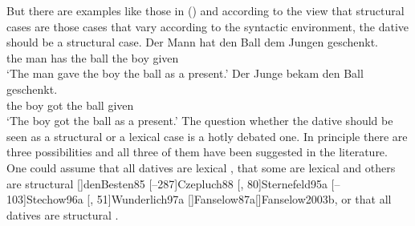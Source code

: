 But there are examples like those in () and according to the view that structural cases are
those cases that vary according to the syntactic environment, the dative should be a structural case.
\eal
\ex 
\gll Der Mann  hat   den Ball dem Jungen geschenkt.\\
     the man   has   the ball the boy given\\
\glt `The man gave the boy the ball as a present.'
\ex 
\gll Der Junge bekam den Ball geschenkt.\\
     the boy   got   the ball given\\   
\glt `The boy got the ball as a present.'
\zl
The question whether the dative should be seen as a structural or a lexical case is a hotly debated
one. In principle there are three possibilities and all three of them have been suggested in the
literature. One could assume that all datives are lexical 
\parencites{Haider85b}%
[]{Haider86}[, 217, 228]{HM94a}%
{Mueller99a,Mueller2001a}[]{Mueller2003e}%
[]{Scherpenisse86a}%
[, 291]{Pollard94a}%
[]{Meurers99b}[]{VS98a}[]{Abraham95a-u}%
[]{McIntyre2006a}, 
that some are lexical and others are structural 
\parencites
{Wegener85a}%
{Wegener90}%
[]{denBesten85}%
[--287]{Czepluch88}%
[, 80]{Sternefeld95a}%
[--103]{Stechow96a}%
[, 51]{Wunderlich97a}%
[]{Fanselow87a}[]{Fanselow2003b},
or that all datives are structural 
\parencites[]{Sternefeld95a}%
[, 205--206]{Ryu97a}%
[--97]{Gunkel2003b}.%

